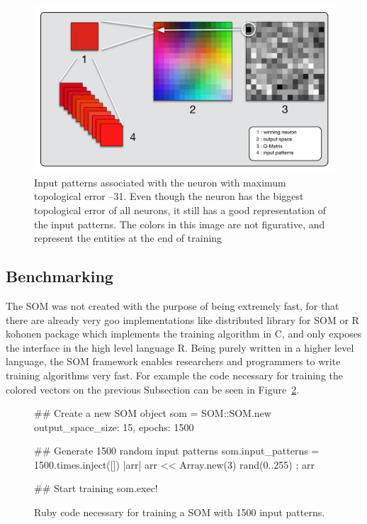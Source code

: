 \begin{figure}[htpb]
  \centering
  \includegraphics[width=0.8\linewidth]{./images/som_trainned.pdf}
  \caption{Input patterns associated with the neuron with maximum topological error --31. Even though the neuron has the biggest topological error of all neurons, it still has a good representation of the input patterns. The colors in this image are not figurative, and represent the entities at the end of training  }
  \label{fig:somtrained}
\end{figure}

\subsection{Benchmarking}
\label{sub:benchmarking}
The \ac{SOM} was not created with the purpose of being extremely fast, for that there are already very goo implementations like \citet{somoclu} distributed library for \ac{SOM} or \citet{rsom} R kohonen package which implements the training algorithm in C, and only exposes the interface in the high level language R.  
Being purely written in a higher level language, the \ac{SOM} framework enables researchers and programmers to write training algorithms very fast. For example the code necessary for training the colored vectors on the previous Subsection can be seen in Figure~\ref{fig:rubysom}.

\begin{figure}[htpb]
  \centering
  \begin{boxedverbatim}
  ## Create a new SOM object
  som = SOM::SOM.new output_space_size: 15, epochs: 1500

  ## Generate 1500 random input patterns
  som.input_patterns = 1500.times.inject([]){ |arr| arr << Array.new(3){ rand(0..255) }; arr  }

  ## Start training
  som.exec!
  \end{boxedverbatim}
  \caption{ Ruby code necessary for training a SOM with 1500 input patterns.  }
  \label{fig:rubysom}
\end{figure}

